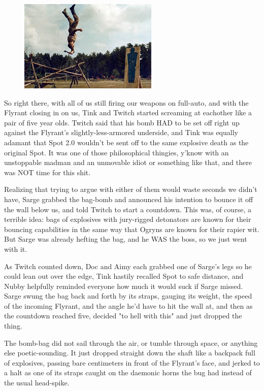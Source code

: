 \begin{figure}
	\begin{center}
		\includegraphics[width=\figwidth]{pics/15/69.png}
	\end{center}
\end{figure}
So right there, with all of us still firing our weapons on full-auto, and with the Flyrant closing in on us, Tink and Twitch started screaming at eachother like a pair of five year olds. 
Twitch said that his bomb HAD to be set off right up against the Flyrant's slightly-less-armored underside, and Tink was equally adamant that Spot 2.0 wouldn't be sent off to the same explosive death as the original Spot. 
It was one of those philosophical thingies, y'know with an unstoppable madman and an unmovable idiot or something like that, and there was NOT time for this shit.

Realizing that trying to argue with either of them would waste seconds we didn't have, Sarge grabbed the bag-bomb and announced his intention to bounce it off the wall below us, and told Twitch to start a countdown. 
This was, of course, a terrible idea: 
bags of explosives with jury-rigged detonators are known for their bouncing capabilities in the same way that Ogryns are known for their rapier wit. 
But Sarge was already hefting the bag, and he WAS the boss, so we just went with it.

As Twitch counted down, Doc and Aimy each grabbed one of Sarge's legs so he could lean out over the edge, Tink hastily recalled Spot to safe distance, and Nubby helpfully reminded everyone how much it would suck if Sarge missed. 
Sarge swung the bag back and forth by its straps, gauging its weight, the speed of the incoming Flyrant, and the angle he'd have to hit the wall at, and then as the countdown reached five, decided "to hell with this" and just dropped the thing.

The bomb-bag did not sail through the air, or tumble through space, or anything else poetic-sounding. 
It just dropped straight down the shaft like a backpack full of explosives, passing bare centimeters in front of the Flyrant's face, and jerked to a halt as one of its straps caught on the daemonic horns the bug had instead of the usual head-spike.

